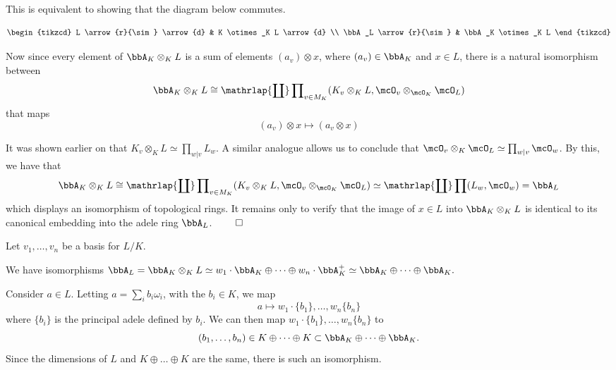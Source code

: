 \documentclass[a4paper, 12pt,oneside,openany]{book}
\begin{document}
 This is equivalent to showing that the diagram below commutes. 

\[
\begin{tikzcd}
L \arrow{r}{\sim} \arrow{d} & K \otimes_K L \arrow{d} \\
\bbA_L \arrow{r}{\sim} & \bbA_K \otimes_K L
\end{tikzcd}
\]	

Now since every element of $\bbA_K \otimes_K L$ is a sum of elements $(a_v) \otimes x$, where $(a_v) \in \bbA_K$ and $x\in L$, there is a natural isomorphism between $$\bbA_K \otimes_K L\cong {\mathrlap{\coprod}\prod}_{v\in M_K} (K_v \otimes_K L, \mcO_v \otimes_{\mcO_K} \mcO_L)$$ that maps $$(a_v) \otimes x \mapsto (a_v \otimes x)$$

It was shown earlier on that $K_v \otimes_K L \simeq \prod_{w|v} L_w$. A similar analogue allows us to conclude that $\mcO_v \otimes_K \mcO_L \simeq \prod_{w|v} \mcO_w$. By this, we have that $$\bbA_K \otimes_K L\cong {\mathrlap{\coprod}\prod}_{v\in M_K} (K_v \otimes_K L, \mcO_v \otimes_{\mcO_K} \mcO_L) \simeq {\mathrlap{\coprod}\prod} (L_w, \mcO_w) = \bbA_L$$ which displays an isomorphism of topological rings. It remains only to verify that the image of $x \in L$ into $\bbA_K \otimes_K L$ is identical to its canonical embedding into the adele ring $\bbA_L$. $\qed$


 Let $v_1, \dots, v_n$ be a basis for $L/K$.

We have isomorphisms $\bbA_L = \bbA_K \otimes_K L \simeq w_1 \cdot \bbA_K \oplus\dots\oplus w_n \cdot \bbA_K^+ \simeq \bbA_K \oplus\dots\oplus \bbA_K.$

Consider $a\in L$. Letting $a = \sum_i b_i\omega_i$, with the $b_i \in K$, we map $$a \mapsto w_1\cdot \{b_1\}, \dots, w_n \{b_n\}$$ where $\{b_i\}$ is the principal adele defined by $b_i$. We can then map $w_1\cdot \{b_1\}, \dots, w_n \{b_n\}$ to $$(b_1, \dots, b_n) \in K\oplus\dots\oplus K \subset \bbA_K\oplus\dots\oplus \bbA_K.$$ Since the dimensions of $L$ and $K\oplus\dots\oplus K$ are the same, there is such an isomorphism. 
\end{document}

